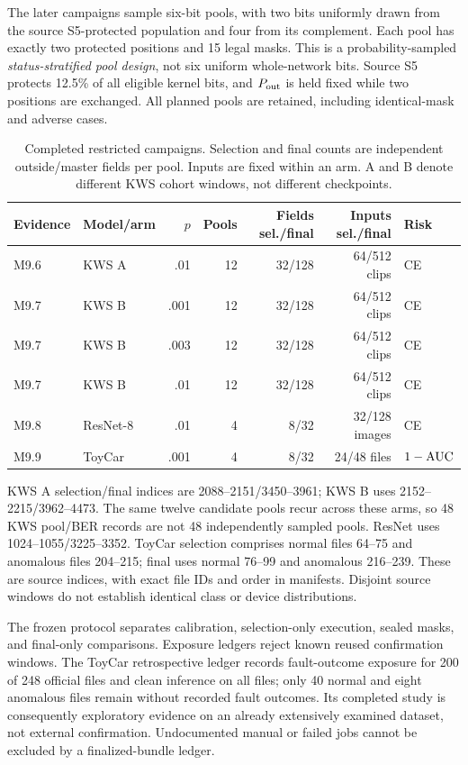 The later campaigns sample six-bit pools, with two bits uniformly drawn from the source S5-protected population and four from its complement. Each pool has exactly two protected positions and 15 legal masks. This is a probability-sampled \emph{status-stratified pool design}, not six uniform whole-network bits. Source S5 protects 12.5\% of all eligible kernel bits, and $P_{\rm out}$ is held fixed while two positions are exchanged. All planned pools are retained, including identical-mask and adverse cases.
\begin{table}[t]
\caption{Completed restricted campaigns. Selection and final counts are independent outside/master fields per pool. Inputs are fixed within an arm. A and B denote different KWS cohort windows, not different checkpoints.}\label{tab:design}
\centering\small
\begin{tabular}{llrrrrl}\toprule
Evidence & Model/arm & $p$ & Pools & Fields sel./final & Inputs sel./final & Risk\\\midrule
M9.6 &KWS A&.01&12&32/128&64/512 clips&CE\\
M9.7 &KWS B&.001&12&32/128&64/512 clips&CE\\
M9.7 &KWS B&.003&12&32/128&64/512 clips&CE\\
M9.7 &KWS B&.01&12&32/128&64/512 clips&CE\\
M9.8 &ResNet-8&.01&4&8/32&32/128 images&CE\\
M9.9 &ToyCar&.001&4&8/32&24/48 files&$1-\mathrm{AUC}$\\\bottomrule
\end{tabular}
\end{table}

KWS A selection/final indices are 2088--2151/3450--3961; KWS B uses 2152--2215/3962--4473. The same twelve candidate pools recur across these arms, so 48 KWS pool/BER records are not 48 independently sampled pools. ResNet uses 1024--1055/3225--3352. ToyCar selection comprises normal files 64--75 and anomalous files 204--215; final uses normal 76--99 and anomalous 216--239. These are source indices, with exact file IDs and order in manifests. Disjoint source windows do not establish identical class or device distributions.

The frozen protocol separates calibration, selection-only execution, sealed masks, and final-only comparisons. Exposure ledgers reject known reused confirmation windows. The ToyCar retrospective ledger records fault-outcome exposure for 200 of 248 official files and clean inference on all files; only 40 normal and eight anomalous files remain without recorded fault outcomes. Its completed study is consequently exploratory evidence on an already extensively examined dataset, not external confirmation. Undocumented manual or failed jobs cannot be excluded by a finalized-bundle ledger.

